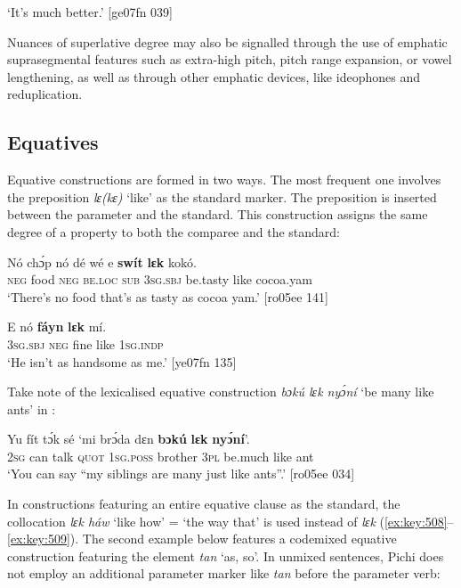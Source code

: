 \glt ‘It’s much better.’ [ge07fn 039]
\z

Nuances of superlative degree may also be signalled through the use of emphatic suprasegmental features such as extra-high pitch, pitch range expansion, or vowel lengthening, as well as through other emphatic devices, like ideophones and reduplication.

\subsection{Equatives}\label{sec:6.9.3}

Equative constructions are formed in two ways. The most frequent one involves the preposition \textit{lɛ(kɛ)} ‘like’ as the standard marker. The preposition is inserted between the parameter and the standard. This construction assigns the same degree of a property to both the comparee and the standard: 


\ea%
    \label{ex:key:505}
    \gll Nó  chɔ́p  nó  dé    wé  e    \textbf{swít}    \textbf{lɛk} kokó.\\
\textsc{neg}  food    \textsc{neg}  \textsc{be.loc}  \textsc{sub}  \textsc{3sg.sbj}  be.tasty  like  cocoa.yam\\

\glt ‘There’s no food that’s as tasty as cocoa yam.’ [ro05ee 141]
\z


\ea%
    \label{ex:key:506}
    \gll E    nó  \textbf{fáyn}  \textbf{lɛk}  mí.\\
\textsc{3sg.sbj}  \textsc{neg}  fine    like  \textsc{1sg.indp}\\

\glt ‘He isn’t as handsome as me.’ [ye07fn 135]
\z

Take note of the lexicalised equative construction \textit{bɔkú lɛk nyɔ́ní} ‘be many like ants’ in : 


\ea%
    \label{ex:key:507}
    \gll Yu  fít  tɔ́k  sé    ‘mi    brɔ́da  dɛn  \textbf{bɔkú} \textbf{lɛk}  \textbf{nyɔ́ní}’.\\
\textsc{2sg}  can  talk  \textsc{quot}    \textsc{1sg.poss}  brother  \textsc{3pl}  be.much  like  ant\\

\glt ‘You can say “my siblings are many just like ants”.’ [ro05ee 034]
\z

In constructions featuring an entire equative clause as the standard, the collocation \textit{lɛk háw} ‘like how’ = ‘the way that’ is used instead of \textit{lɛk} (\ref{ex:key:508}–\ref{ex:key:509}). The second example below features a codemixed equative construction featuring the  element \textit{tan} ‘as, so’. In unmixed sentences, Pichi does not employ an additional parameter marker like \textit{tan} before the parameter verb:


